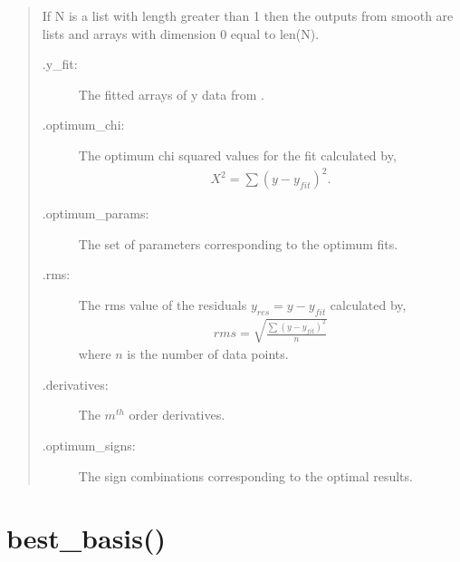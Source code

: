 \documentclass[letterpaper,10pt,english]{sphinxmanual}
\begin{document}
\begin{fulllineitems}
\begin{quote}
\begin{description}
\end{description}
\end{quote}

\begin{quote}

If N is a list with length greater than 1 then the outputs from smooth
are lists and arrays with dimension 0 equal to len(N).
\begin{description}
\item[{.y\_fit:}] \leavevmode
{} The fitted arrays of y data from .

\item[{.optimum\_chi:}] \leavevmode
{} The optimum chi squared values for the fit calculated
by,
\begin{equation*}
\begin{split}{X^2=\sum(y-y_{fit})^2}.\end{split}
\end{equation*}
\item[{.optimum\_params:}] \leavevmode
{} The set of parameters corresponding to the optimum
fits.

\item[{.rms:}] \leavevmode
{} The rms value of the residuals \({y_{res}=y-y_{fit}}\)
calculated by,
\begin{equation*}
\begin{split}{rms=\sqrt{\frac{\sum(y-y_{fit})^2}{n}}}\end{split}
\end{equation*}
where \(n\) is the number of data points.

\item[{.derivatives:}] \leavevmode
{} The \(m^{th}\) order derivatives.

\item[{.optimum\_signs:}] \leavevmode
{} The sign combinations corresponding to the
optimal results.

\end{description}
\end{quote}

\end{fulllineitems}



\section{best\_basis()}
\label{\detokenize{source/maxsmooth:module-maxsmooth.best_basis}}\label{\detokenize{source/maxsmooth:best-basis}}
\end{document}
